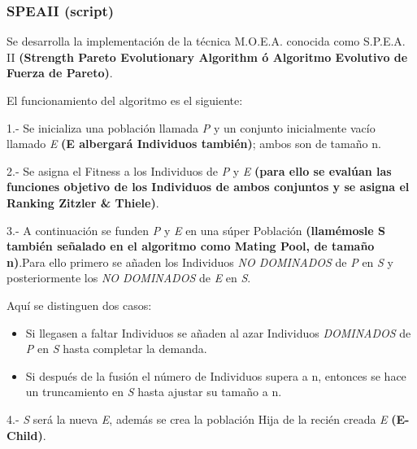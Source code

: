 \documentclass[letterpaper,10pt,english]{sphinxmanual}
\begin{document}
\subsubsection{SPEAII (script)}
\label{Model/MOEA/SPEAII::doc}\label{Model/MOEA/SPEAII:speaii-script}
Se desarrolla la implementación de la técnica M.O.E.A. conocida como S.P.E.A. II
\textbf{(Strength Pareto Evolutionary Algorithm ó Algoritmo Evolutivo de Fuerza de Pareto)}.

El funcionamiento del algoritmo es el siguiente:

\begin{DUlineblock}{0em}
\item[] 1.- Se inicializa una población llamada \emph{P} y un conjunto inicialmente vacío llamado \emph{E} \textbf{(E albergará Individuos también)}; ambos son de tamaño n.
\end{DUlineblock}

\begin{DUlineblock}{0em}
\item[] 2.- Se asigna el Fitness a los Individuos de \emph{P} y \emph{E} \textbf{(para ello se evalúan las funciones objetivo de los Individuos de ambos conjuntos y se asigna el Ranking Zitzler \& Thiele)}.
\end{DUlineblock}

\begin{DUlineblock}{0em}
\item[] 3.- A continuación se funden \emph{P} y \emph{E} en una súper Población \textbf{(llamémosle S también señalado en el algoritmo como Mating Pool, de tamaño n)}.Para ello primero se añaden los Individuos \emph{NO DOMINADOS} de \emph{P} en \emph{S} y posteriormente los \emph{NO DOMINADOS} de \emph{E} en \emph{S}.
\item[] Aquí se distinguen dos casos:
\end{DUlineblock}
\begin{itemize}
\item {} 
Si llegasen a faltar Individuos se añaden al azar Individuos \emph{DOMINADOS} de \emph{P} en \emph{S} hasta completar la demanda.

\item {} 
Si después de la fusión el número de Individuos supera a n, entonces se hace un truncamiento en \emph{S} hasta ajustar su tamaño a n.

\end{itemize}

\begin{DUlineblock}{0em}
\item[] 4.- \emph{S} será la nueva \emph{E}, además se crea la población Hija de la recién creada \emph{E} \textbf{(E-Child)}.
\end{DUlineblock}
\end{document}
